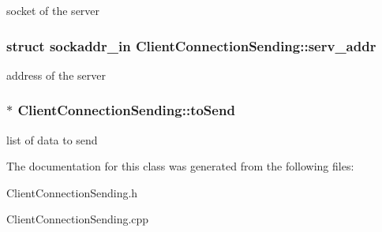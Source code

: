 socket of the server \hypertarget{class_client_connection_sending_a46e362e1ad62b3bae76885281fe99a21}{
\subsubsection[{serv\-\_\-addr}]{\setlength{\rightskip}{0pt plus 5cm}struct sockaddr\-\_\-in Client\-Connection\-Sending\-::serv\-\_\-addr\hspace{0.3cm}{\ttfamily [private]}}}\label{class_client_connection_sending_a46e362e1ad62b3bae76885281fe99a21}
address of the server \hypertarget{class_client_connection_sending_a148ca07a2280bd684561fc2943d5fc9d}{
\subsubsection[{to\-Send}]{$\ast$ Client\-Connection\-Sending\-::to\-Send\hspace{0.3cm}{\ttfamily [private]}}}\label{class_client_connection_sending_a148ca07a2280bd684561fc2943d5fc9d}
list of data to send 

The documentation for this class was generated from the following files\-:\begin{DoxyCompactItemize}
\item 
Client\-Connection\-Sending.\-h\item 
Client\-Connection\-Sending.\-cpp\end{DoxyCompactItemize}
